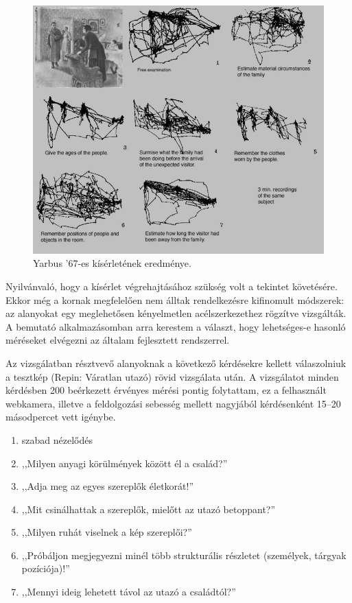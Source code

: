 \begin{figure}[!ht]
\centering
\includegraphics[width=140mm, keepaspectratio]{figures/yarbus.jpg}
\caption{Yarbus '67-es kísérletének eredménye.}
\label{fig:yarbus}
\end{figure}

Nyilvánvaló, hogy a kísérlet végrehajtásához szükség volt a tekintet követésére. Ekkor még a kornak megfelelően nem álltak rendelkezésre kifinomult módszerek: az alanyokat egy meglehetősen kényelmetlen acélszerkezethez rögzítve vizsgálták. A bemutató alkalmazásomban arra kerestem a választ, hogy lehetséges-e hasonló méréseket elvégezni az általam fejlesztett rendszerrel.

\bigskip

Az vizsgálatban résztvevő alanyoknak a következő kérdésekre kellett válaszolniuk a tesztkép (Repin: Váratlan utazó) rövid vizsgálata után. A vizsgálatot minden kérdésben 200 beérkezett érvényes mérési pontig folytattam, ez a felhasznált webkamera, illetve a feldolgozási sebesség mellett nagyjából kérdésenként 15--20 másodpercet vett igénybe.

\bigskip
\bigskip


\begin{enumerate}
 \item szabad nézelődés
 \item ,,Milyen anyagi körülmények között él a család?''
 \item ,,Adja meg az egyes szereplők életkorát!''
 \item ,,Mit csinálhattak a szereplők, mielőtt az utazó betoppant?''
 \item ,,Milyen ruhát viselnek a kép szereplői?''
 \item ,,Próbáljon megjegyezni minél több strukturális részletet (személyek, tárgyak pozíciója)!''
 \item ,,Mennyi ideig lehetett távol az utazó a családtól?''
\end{enumerate}

